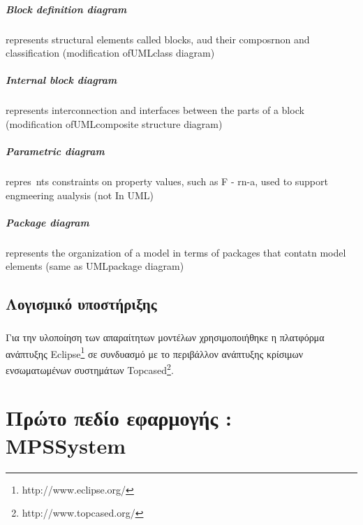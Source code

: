 \documentclass[a4paper,12pt,twoside]{report}
\begin{document}
{			\paragraph{Block definition diagram} {represents structural elements called blocks, aud their composrnon and classification (modification ofUMLclass diagram)
			}
			\paragraph{Internal block diagram} {represents interconnection and interfaces between the parts of a block (modification ofUMLcomposite structure diagram)
			}
			\paragraph{Parametric diagram} {repres~nts constraints on property values, such as F - rn-a, used to support engmeering aualysis
			(not In UML)
			}
			\paragraph{Package diagram} {represents the organization of a model in terms of packages that contatn model elements (same as UMLpackage diagram)
			}
					
		\section{Λογισμικό υποστήριξης}
		
			\paragraph{} {Για την υλοποίηση των απαραίτητων μοντέλων χρησιμοποιήθηκε η πλατφόρμα ανάπτυξης Eclipse\footnote{http://www.eclipse.org/} σε συνδυασμό με το περιβάλλον ανάπτυξης κρίσιμων ενσωματωμένων συστημάτων Topcased\footnote{http://www.topcased.org/}.
			}
		
		
	\chapter{Πρώτο πεδίο εφαρμογής :\\ MPS\textregistered  System}
		\label{κεφ.:Πρώτο πεδίο εφαρμογής : MPS System}

}
\end{document}
